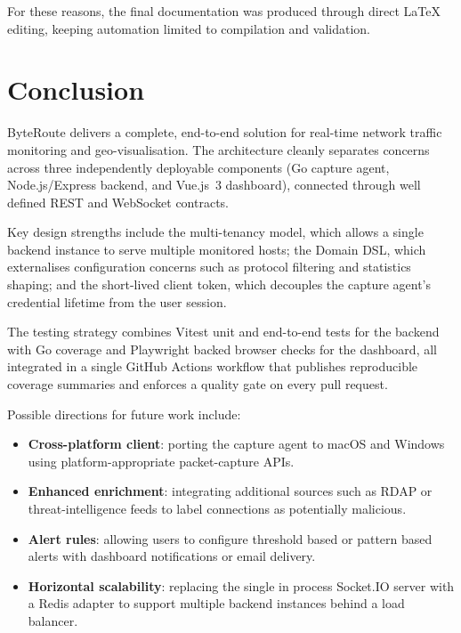\documentclass[12pt]{report}
\begin{document}
For these reasons, the final documentation was produced through direct LaTeX editing,
keeping automation limited to compilation and validation.

\chapter{Conclusion}
\label{ch:conclusion}

ByteRoute delivers a complete, end-to-end solution for real-time network traffic monitoring
and geo-visualisation. The architecture cleanly separates concerns across three independently
deployable components (Go capture agent, Node.js/Express backend, and Vue.js~3 dashboard),
connected through well defined REST and WebSocket contracts.

Key design strengths include the multi-tenancy model, which allows a single backend instance
to serve multiple monitored hosts; the Domain DSL, which externalises configuration concerns
such as protocol filtering and statistics shaping; and the short-lived client token, which
decouples the capture agent's credential lifetime from the user session.

The testing strategy combines Vitest unit and end-to-end tests for the backend with Go
coverage and Playwright backed browser checks for the dashboard, all integrated in a single
GitHub Actions workflow that publishes reproducible coverage summaries and enforces a
quality gate on every pull request.

Possible directions for future work include:

\begin{itemize}
    \item \textbf{Cross-platform client}: porting the capture agent to macOS and Windows
          using platform-appropriate packet-capture APIs.
    \item \textbf{Enhanced enrichment}: integrating additional sources such as RDAP or
          threat-intelligence feeds to label connections as potentially malicious.
    \item \textbf{Alert rules}: allowing users to configure threshold based or
          pattern based alerts with dashboard notifications or email delivery.
    \item \textbf{Horizontal scalability}: replacing the single in process Socket.IO
          server with a Redis adapter to support multiple backend instances behind
          a load balancer.
\end{itemize}
\end{document}
